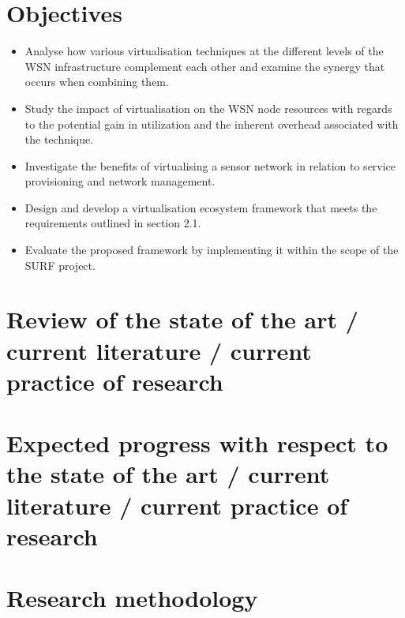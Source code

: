 \documentclass[11pt]{article}
\begin{document}
\section{Objectives}

\begin{itemize}
	\item Analyse how various virtualisation techniques at the different levels of the WSN infrastructure complement each other and examine the synergy that occurs when combining them.
	
	\item Study the impact of virtualisation on the WSN node resources with regards to the potential gain in utilization and the inherent overhead associated with the technique.
	
	\item Investigate the benefits of virtualising a sensor network in relation to service provisioning and network management.
	
	\item Design and develop a virtualisation ecosystem framework that meets the requirements outlined in section 2.1.
	
	\item Evaluate the proposed framework by implementing it within the scope of the SURF project.	
\end{itemize}
\bigskip



\pagebreak
\section{Review of the state of the art / current literature / current practice of research}
\bigskip









%





\pagebreak
\section{Expected progress with respect to the state of the art / current literature / current practice of research}


\pagebreak
\section{Research methodology}

\pagebreak
\end{document}
